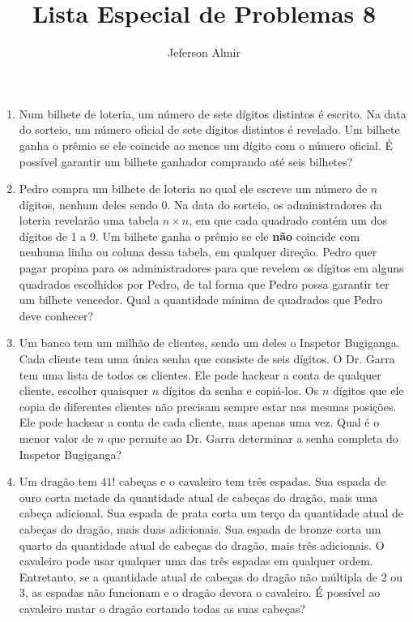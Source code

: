 \documentclass{article}
\title{Lista Especial de Problemas 8}
\author{Jeferson Almir}
\date{}
\begin{document}
\maketitle

\begin{enumerate}
    \item Num bilhete de loteria, um número de sete dígitos distintos é escrito.
    Na data do sorteio, um número oficial de sete dígitos distintos é revelado.
    Um bilhete ganha o prêmio se ele coincide ao menos um dígito com o número oficial.
    É possível garantir um bilhete ganhador comprando até seis bilhetes?
    
    \item Pedro compra um bilhete de loteria no qual ele escreve um número de $n$ dígitos,
    nenhum deles sendo 0.
    Na data do sorteio, os administradores da loteria revelarão uma tabela $n\times n$,
    em que cada quadrado contém um dos dígitos de 1 a 9.
    Um bilhete ganha o prêmio se ele \textbf{não} coincide com nenhuma linha ou coluna dessa tabela, em qualquer direção.
    Pedro quer pagar propina para os administradores para que revelem os dígitos em alguns quadrados escolhidos por Pedro,
    de tal forma que Pedro possa garantir ter um bilhete vencedor.
    Qual a quantidade mínima de quadrados que Pedro deve conhecer?
    
    \item Um banco tem um milhão de clientes,
    sendo um deles o Inspetor Bugiganga.
    Cada cliente tem uma única senha que consiste de seis dígitos.
    O Dr. Garra tem uma lista de todos os clientes.
    Ele pode hackear a conta de qualquer cliente,
    escolher quaisquer $n$ dígitos da senha e copiá-los.
    Os $n$ dígitos que ele copia de diferentes clientes
    não precisam sempre estar nas mesmas posições.
    Ele pode hackear a conta de cada cliente, mas apenas uma vez.
    Qual é o menor valor de $n$ que permite ao Dr. Garra
    determinar a senha completa do Inspetor Bugiganga?
    
    \item Um dragão tem $41!$ cabeças e o cavaleiro tem três espadas.
    Sua espada de ouro corta metade da quantidade atual de cabeças do dragão, mais uma cabeça adicional.
    Sua espada de prata corta um terço da quantidade atual de cabeças do dragão, mais duas adicionais.
    Sua espada de bronze corta um quarto da quantidade atual de cabeças do dragão, mais três adicionais.
    O cavaleiro pode usar qualquer uma das três espadas em qualquer ordem.
    Entretanto, se a quantidade atual de cabeças do dragão não múltipla de 2 ou 3,
    as espadas não funcionam e o dragão devora o cavaleiro.
    É possível ao cavaleiro matar o dragão cortando todas as suas cabeças?
    

\end{enumerate}
\end{document}
